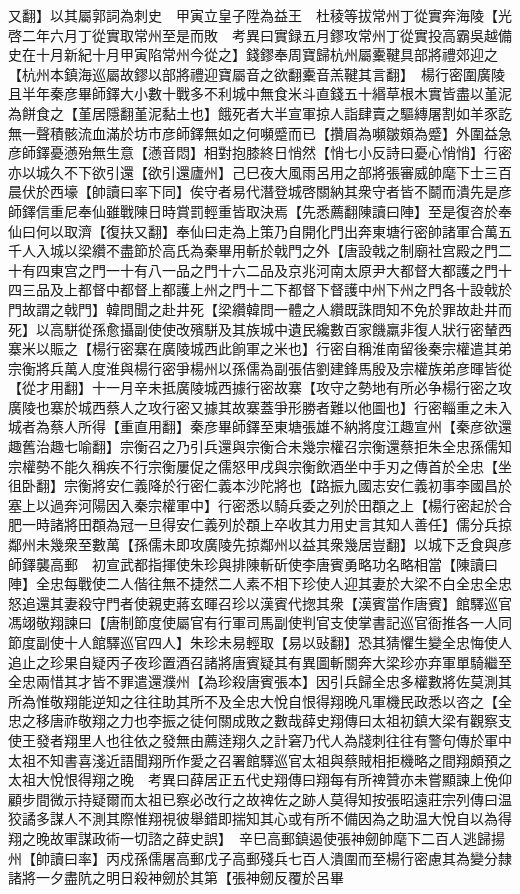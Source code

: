 又翻】以其屬郭詞為刺史　甲寅立皇子陞為益王　杜稜等拔常州丁從實奔海陵【光啓二年六月丁從實取常州至是而敗　考異曰實録五月鏐攻常州丁從實投高霸吳越備史在十月新紀十月甲寅陷常州今從之】錢鏐奉周寶歸杭州屬櫜鞬具部將禮郊迎之【杭州本鎮海巡屬故鏐以部將禮迎寶屬音之欲翻櫜音羔鞬其言翻】　楊行密圍廣陵且半年秦彦畢師鐸大小數十戰多不利城中無食米斗直錢五十緡草根木實皆盡以堇泥為餅食之【堇居隱翻堇泥黏土也】餓死者大半宣軍掠人詣肆賣之驅縳屠割如羊豕訖無一聲積骸流血滿於坊市彦師鐸無如之何嚬蹙而已【攢眉為嚬皺頞為蹙】外圍益急彦師鐸憂懣殆無生意【懣音悶】相對抱膝終日悄然【悄七小反詩曰憂心悄悄】行密亦以城久不下欲引還【欲引還廬州】己巳夜大風雨呂用之部將張審威帥麾下士三百晨伏於西壕【帥讀曰率下同】俟守者易代潛登城啓關納其衆守者皆不鬬而潰先是彦師鐸信重尼奉仙雖戰陳日時賞罰輕重皆取決焉【先悉薦翻陳讀曰陣】至是復咨於奉仙曰何以取濟【復扶又翻】奉仙曰走為上策乃自開化門出奔東塘行密帥諸軍合萬五千人入城以梁纘不盡節於高氏為秦畢用斬於戟門之外【唐設戟之制廟社宫殿之門二十有四東宫之門一十有八一品之門十六二品及京兆河南太原尹大都督大都護之門十四三品及上都督中都督上都護上州之門十二下都督下督護中州下州之門各十設戟於門故謂之戟門】韓問聞之赴井死【梁纘韓問一體之人纘既誅問知不免於罪故赴井而死】以高駢從孫愈攝副使使改殯駢及其族城中遺民纔數百家饑羸非復人狀行密輦西寨米以賑之【楊行密寨在廣陵城西此餉軍之米也】行密自稱淮南留後秦宗權遣其弟宗衡將兵萬人度淮與楊行密爭楊州以孫儒為副張佶劉建鋒馬殷及宗權族弟彦暉皆從【從才用翻】十一月辛未抵廣陵城西據行密故寨【攻守之勢地有所必争楊行密之攻廣陵也寨於城西蔡人之攻行密又據其故寨蓋爭形勝者難以他圖也】行密輜重之未入城者為蔡人所得【重直用翻】秦彦畢師鐸至東塘張雄不納將度江趣宣州【秦彦欲還趣舊治趣七喻翻】宗衡召之乃引兵還與宗衡合未幾宗權召宗衡還蔡拒朱全忠孫儒知宗權勢不能久稱疾不行宗衡屢促之儒怒甲戌與宗衡飲酒坐中手刃之傳首於全忠【坐徂卧翻】宗衡將安仁義降於行密仁義本沙陀將也【路振九國志安仁義初事李國昌於塞上以過奔河陽因入秦宗權軍中】行密悉以騎兵委之列於田頵之上【楊行密起於合肥一時諸將田頵為冠一旦得安仁義列於頵上卒收其力用史言其知人善任】儒分兵掠鄰州未幾衆至數萬【孫儒未即攻廣陵先掠鄰州以益其衆幾居豈翻】以城下乏食與彦師鐸襲高郵　初宣武都指揮使朱珍與排陳斬斫使李唐賓勇略功名略相當【陳讀曰陣】全忠每戰使二人偕往無不捷然二人素不相下珍使人迎其妻於大梁不白全忠全忠怒追還其妻殺守門者使親吏蔣玄暉召珍以漢賓代揔其衆【漢賓當作唐賓】館驛巡官馮翊敬翔諫曰【唐制節度使屬官有行軍司馬副使判官支使掌書記巡官衙推各一人同節度副使十人館驛巡官四人】朱珍未易輕取【易以䜴翻】恐其猜懼生變全忠悔使人追止之珍果自疑丙子夜珍置酒召諸將唐賓疑其有異圖斬關奔大梁珍亦弃軍單騎繼至全忠兩惜其才皆不罪遣還濮州【為珍殺唐賓張本】因引兵歸全忠多權數將佐莫測其所為惟敬翔能逆知之往往助其所不及全忠大悅自恨得翔晚凡軍機民政悉以咨之【全忠之移唐祚敬翔之力也李振之徒何關成敗之數哉薛史翔傳曰太祖初鎮大梁有觀察支使王發者翔里人也往依之發無由薦逹翔久之計窘乃代人為牋刺往往有警句傳於軍中太祖不知書喜淺近語聞翔所作愛之召署館驛巡官太祖與蔡賊相拒機略之間翔頗預之太祖大悅恨得翔之晚　考異曰薛居正五代史翔傳曰翔每有所禆贊亦未嘗顯諫上俛仰顧步間微示持疑爾而太祖已察必改行之故禆佐之跡人莫得知按張昭遠莊宗列傳曰温狡譎多謀人不測其際惟翔視彼舉錯即揣知其心或有所不備因為之助温大悅自以為得翔之晚故軍謀政術一切諮之薛史誤】　辛巳高郵鎮遏使張神劒帥麾下二百人逃歸揚州【帥讀曰率】丙戍孫儒屠高郵戊子高郵殘兵七百人潰圍而至楊行密慮其為變分隸諸將一夕盡阬之明日殺神劒於其第【張神劒反覆於呂畢